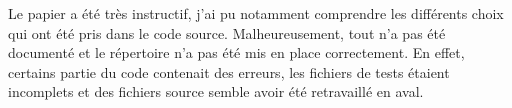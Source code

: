 Le papier a été très instructif, j'ai pu notamment comprendre les différents choix qui ont été pris dans le code source. 
Malheureusement, tout n'a pas été documenté et le répertoire n'a pas été mis en place correctement. 
En effet, certains partie du code contenait des erreurs, les fichiers de tests étaient incomplets et des fichiers source semble avoir été retravaillé en aval.